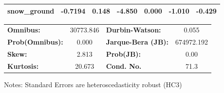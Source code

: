 \begin{center}
\begin{tabular}{lcccccc}
\textbf{snow\_ground} &      -0.7194  &        0.148     &    -4.850  &         0.000        &       -1.010    &       -0.429     \\
\bottomrule
\end{tabular}
\begin{tabular}{lclc}
\textbf{Omnibus:}       & 30773.846 & \textbf{  Durbin-Watson:     } &     0.055   \\
\textbf{Prob(Omnibus):} &    0.000  & \textbf{  Jarque-Bera (JB):  } & 674972.192  \\
\textbf{Skew:}          &    2.813  & \textbf{  Prob(JB):          } &      0.00   \\
\textbf{Kurtosis:}      &   20.673  & \textbf{  Cond. No.          } &      71.3   \\
\bottomrule
\end{tabular}
\end{center}

Notes: \newline
 [1] Standard Errors are heteroscedasticity robust (HC3)